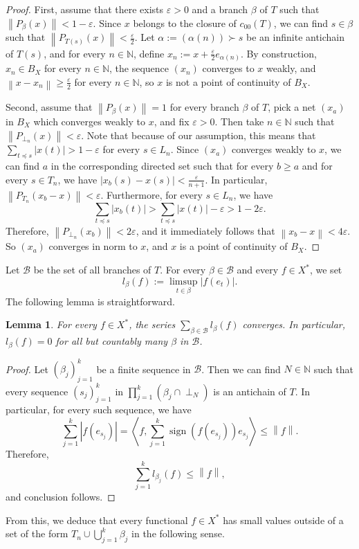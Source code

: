 \documentclass[11pt,a4paper,reqno]{amsart}
\numberwithin{equation}{section}
\newcommand{\abs}[1]{\left\lvert#1\right\rvert}
\newcommand{\norm}[1]{\left\lVert#1\right\rVert}
\newcommand{\N}{\mathbb{N}}
\newcommand{\B}{\mathcal{B}}
\newcommand{\eps}{\varepsilon}
\newcommand{\scal}[1]{\left\langle#1\right\rangle}
\DeclareMathOperator{\sign}{sign}
\newcommand{\1}{\mathbbm{1}}
\renewcommand{\geq}{\geqslant}
\renewcommand{\leq}{\leqslant}
\theoremstyle{plain}
\newtheorem{lemma}[theorem]{Lemma}
\theoremstyle{definition}
\begin{document}
\begin{proof}
First, assume that there exists $\eps>0$ and a branch $\beta$ of $T$ such that $\norm{P_{\beta}(x)}<1-\varepsilon$. Since $x$ belongs to the closure of $c_{00}(T)$, we can find $s\in\beta$ such that $\norm{P_{T(s)}(x)}<\frac{\eps}{2}$. Let $\alpha:=(\alpha(n))\succ s$ be an infinite antichain of $T(s)$, and for every $n\in\N$, define $x_n:=x+\frac{\eps}{2}e_{\alpha(n)}$. By construction, $x_n\in B_X$ for every $n\in \N$, the sequence $(x_n)$ converges to $x$ weakly, and $\norm{x-x_n}\geq \frac{\eps}{2}$ for every $n\in\mathbb{N}$, so $x$ is not a point of continuity of $B_X$. 

Second, assume that $\norm{P_{\beta}(x)}=1$ for every branch $\beta$ of $T$, pick a net $(x_a)$ in $B_X$ which converges weakly to $x$, and fix $\eps>0$. Then take $n\in\N$ such that $\norm{P_{\perp_n}(x)}<\eps$. Note that because of our assumption, this means that $\sum_{t\preceq s}\abs{x(t)}>1-\eps$ for every $s\in L_n$. Since $(x_a)$ converges weakly to $x$, we can find $a$ in the corresponding directed set such that for every $b \geq a$ and for every $s\in T_n$, we have $\abs{x_b(s)-x(s)}<\frac{\eps}{n+1}$. In particular, $\norm{P_{T_n}(x_b-x)}<\eps$. Furthermore, for every $s\in L_n$, we have \begin{equation*}
    \sum_{t\preceq s}\abs{x_b(t)}>\sum_{t\preceq s}\abs{x(t)}-\eps>1-2\eps.
\end{equation*} Therefore, $\norm{P_{\perp_n}(x_b)}<2\eps$, and it immediately follows that $\norm{x_b-x}<4\eps$. So $(x_a)$ converges in norm to $x$, and $x$ is a point of continuity of $B_X$.  
\end{proof}

Let $\B$ be the set of all branches of $T$. For every $\beta\in\B$ and every $f\in X^*$, we set \begin{equation*}
    l_\beta(f):=\limsup_{t\in\beta}\abs{f(e_t)}.
\end{equation*} The following lemma is straightforward.

\begin{lemma}
    For every $f\in X^*$, the series $\sum_{\beta\in\B}l_\beta(f)$ converges. In particular, $l_\beta(f)=0$ for all but countably many $\beta$ in $\B$.
\end{lemma}

\begin{proof}
 Let $(\beta_j)_{j=1}^k$ be a finite sequence in $\B$. Then we can find $N\in\N$ such that every sequence $(s_j)_{j=1}^k$ in $\prod_{j=1}^k(\beta_j\cap \perp_N)$ is an antichain of $T$. In particular, for every such sequence, we have \begin{equation*}
 \sum_{j=1}^k\abs{f(e_{s_j})}=\scal{f,\sum_{j=1}^k\sign(f(e_{s_j}))e_{s_j}}\leq \norm{f}.
 \end{equation*} Therefore, \begin{equation*}
     \sum_{j=1}^kl_{\beta_j}(f)\leq \norm{f},
 \end{equation*} and conclusion follows. 
\end{proof} From this, we deduce that every functional $f\in X^*$ has small values outside of a set of the form $T_n\cup \bigcup_{j=1}^k\beta_j$ in the following sense. 
\end{document}
